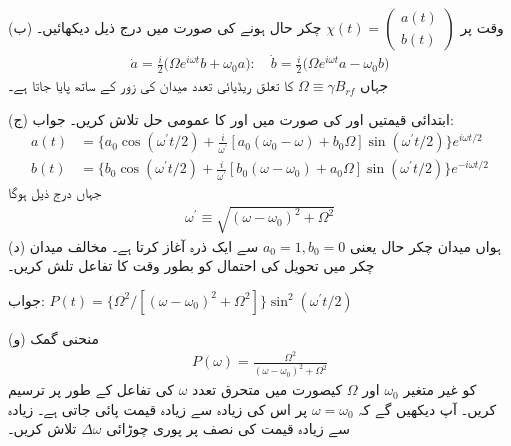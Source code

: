 (ب) وقت  پر \(\chi(t) = \begin{pmatrix}a(t) \\b(t)\end{pmatrix}\) چکر حال ہونے کی صورت میں درج ذیل دیکھائیں۔
\begin{align}
	\dot{a} = \frac{i}{2}\big(\Omega e^{i\omega t}b+\omega_0 a\big):\quad\dot{b} = \frac{i}{2}\big(\Omega e^{i\omega t}a-\omega_0 b\big)
\end{align}
جہاں \(\Omega\equiv\gamma B_{rf}\) کا تعلق ریڈیائی تعدد میدان کی زور کے ساتھ پایا جاتا ہے۔

(ج) ابتدائی قیمتیں  اور  کی صورت میں  اور  کا عمومی حل تلاش کریں۔ جواب: 
\begin{align*}
	a(t) &= \bigg\{a_0\cos(\omega^\prime t/2)+\frac{i}{\omega^\prime}[a_0(\omega_0-\omega)+b_0\Omega]\sin(\omega^\prime t/2)\bigg\}e^{i\omega t/2} \\
	b(t) &= \bigg\{b_0\cos(\omega^\prime t/2)+\frac{i}{\omega^\prime}[b_0(\omega-\omega_0)+a_0\Omega]\sin(\omega^\prime t/2)\bigg\}e^{-i\omega t/2}
\end{align*}
جہاں درج ذیل ہوگا
\begin{align}
	\omega^\prime\equiv\sqrt{(\omega-\omega_0)^2+\Omega^2}
\end{align}
(د) ہواں میدان چکر حال یعنی \(a_0 = 1, b_0 = 0\) سے ایک ذرہ آغاز کرتا ہے۔ مخالف میدان چکر میں تحویل کی احتمال کو بطور وقت کا تفاعل تلش کریں۔

جواب: \(P(t) = \{\Omega^2/[(\omega-\omega_0)^2+\Omega^2]\}\sin^2(\omega^\prime t/2)\)

(و) منحنی گمک
\begin{align}
	P(\omega) = \frac{\Omega^2}{(\omega-\omega_0)^2+\Omega^2}
\end{align}
کو غیر متغیر \(\omega_0\) اور \(\Omega\) کیصورت میں متحرق تعدد \(\omega\) کی تفاعل کے طور پر ترسیم کریں۔ آپ دیکھیں گے کہ \(\omega = \omega_0\) پر اس کی زیادہ سے زیادہ قیمت پائی جاتی ہے۔ زیادہ سے زیادہ قیمت کی نصف پر پوری چوڑائی \(\Delta\omega\) تلاش کریں۔

